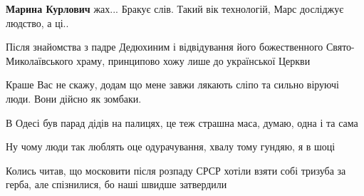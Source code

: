 \begin{itemize}
\begin{itemize}
 
\textbf{Марина Курлович} жах... Бракує слів. Такий вік технологій, Марс досліджує людство, а ці..
\end{itemize}

 

Після знайомства з падре Дедюхиним і відвідування його божественного
Свято-Миколаївського храму, принципово хожу лише до української Церкви


 

Краше Вас не скажу, додам що мене завжи лякають сліпо та сильно віруючі люди.
Вони дійсно як зомбаки.

В Одесі був парад дідів на палицях, це теж страшна маса, думаю, одна і та сама


 
Ну чому люди так люблять оце одурачування, хвалу тому гундяю, я в шоці

 
Колись читав, що московити після розпаду СРСР хотіли взяти собі тризуба за герба, але спізнилися, бо наші швидше затвердили

 

\end{itemize}
